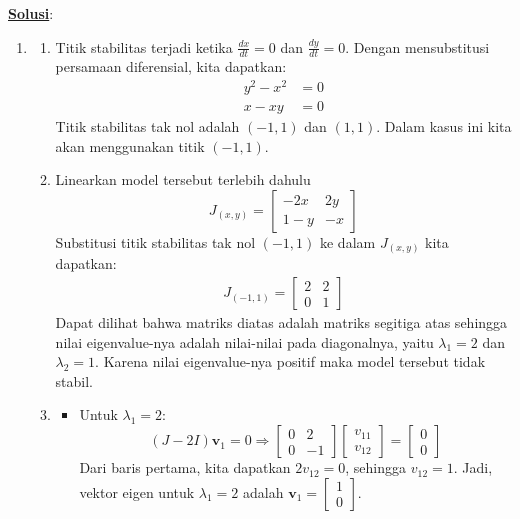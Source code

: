 \documentclass{article}
\newcommand{\jawab}{\textbf{\underline{Solusi}}:}
\begin{document}
    \newpage
    \jawab
    \begin{enumerate}
        \item \begin{enumerate}[label=\alph*.]
            \item Titik stabilitas terjadi ketika $\frac{dx}{dt}=0$ dan $\frac{dy}{dt}=0$. Dengan mensubstitusi persamaan diferensial, kita dapatkan:
            \begin{align*}
                y^2-x^2 &= 0\\
                x-xy &= 0
            \end{align*}
            Titik stabilitas tak nol adalah $(-1,1)$ dan $(1,1)$. Dalam kasus ini kita akan menggunakan titik $(-1,1)$. 
            \item Linearkan model tersebut terlebih dahulu
            \[
                J_{(x,y)} = \begin{bmatrix}
                    -2x & 2y\\
                    1-y & -x
                \end{bmatrix}
            \]
            Substitusi titik stabilitas tak nol $(-1,1)$ ke dalam $J_{(x,y)}$ kita dapatkan:
            \begin{align*}
                J_{(-1,1)} = \begin{bmatrix}
                    2 & 2\\
                    0 & 1
                \end{bmatrix}
            \end{align*}
            Dapat dilihat bahwa matriks diatas adalah matriks segitiga atas sehingga nilai eigenvalue-nya adalah nilai-nilai pada diagonalnya, yaitu $\lambda_1=2$ dan $\lambda_2=1$. Karena nilai eigenvalue-nya positif maka model tersebut tidak stabil.
            \item \begin{itemize}
                \item Untuk \( \lambda_1 = 2 \):
                \[
                (J - 2I)\mathbf{v}_1 = 0 \Rightarrow \begin{bmatrix} 0 & 2 \\ 0 & -1 \end{bmatrix} \begin{bmatrix} v_{11} \\ v_{12} \end{bmatrix} = \begin{bmatrix} 0 \\ 0 \end{bmatrix}
                \]
                Dari baris pertama, kita dapatkan \( 2v_{12} = 0 \), sehingga \( v_{12} = 1 \). Jadi, vektor eigen untuk \( \lambda_1 = 2 \) adalah \( \mathbf{v}_1 = \begin{bmatrix} 1 \\ 0 \end{bmatrix} \).
                

\end{itemize}
\end{enumerate}
\end{enumerate}
\end{document}
